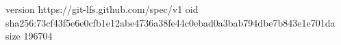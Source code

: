 version https://git-lfs.github.com/spec/v1
oid sha256:73cf43f5e6e0cfb1e12abe4736a38fe44c0ebad0a3bab794dbe7b843e1e701da
size 196704
